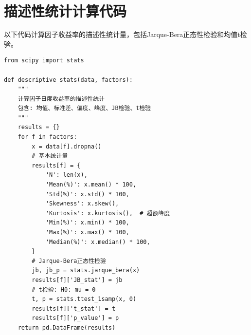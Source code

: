 \documentclass[
    decl-page,
    oneside,
  ]{njuthesis}
\begin{document}
\section{描述性统计计算代码}

以下代码计算因子收益率的描述性统计量，包括Jarque-Bera正态性检验和均值t检验。

\begin{lstlisting}[style=pythonstyle, caption={描述性统计量计算}]
from scipy import stats

def descriptive_stats(data, factors):
    """
    计算因子日度收益率的描述性统计
    包含: 均值、标准差、偏度、峰度、JB检验、t检验
    """
    results = {}
    for f in factors:
        x = data[f].dropna()
        # 基本统计量
        results[f] = {
            'N': len(x),
            'Mean(%)': x.mean() * 100,
            'Std(%)': x.std() * 100,
            'Skewness': x.skew(),
            'Kurtosis': x.kurtosis(),  # 超额峰度
            'Min(%)': x.min() * 100,
            'Max(%)': x.max() * 100,
            'Median(%)': x.median() * 100,
        }
        # Jarque-Bera正态性检验
        jb, jb_p = stats.jarque_bera(x)
        results[f]['JB_stat'] = jb
        # t检验: H0: mu = 0
        t, p = stats.ttest_1samp(x, 0)
        results[f]['t_stat'] = t
        results[f]['p_value'] = p
    return pd.DataFrame(results)
\end{lstlisting}
\end{document}
